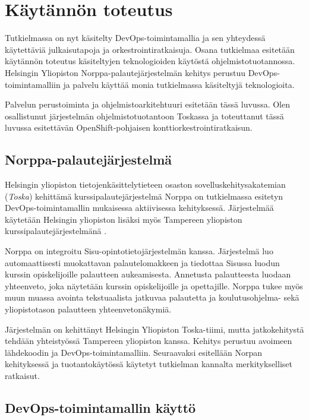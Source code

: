 \chapter{Käytännön toteutus\label{example}}

Tutkielmassa on nyt käsitelty DevOps-toimintamallia ja sen yhteydessä käytettäviä julkaisutapoja ja orkestrointiratkaisuja.
Osana tutkielmaa esitetään käytännön toteutus käsiteltyjen teknologioiden käytöstä ohjelmistotuotannossa.
Helsingin Yliopiston Norppa-palautejärjes\-telmän kehitys perustuu DevOps-toimintamalliin ja palvelu käyttää monia tutkielmassa käsiteltyjä teknologioita.

Palvelun perustoiminta ja ohjelmistoarkitehtuuri esitetään tässä luvussa.
Olen osallistunut järjestelmän ohjelmistotuotantoon Toskassa ja toteuttanut tässä luvussa esitettävän OpenShift-pohjaisen konttiorkestrointiratkaisun.

\section{Norppa-palautejärjestelmä}

Helsingin yliopiston tietojenkäsittelytieteen osaston sovelluskehitysakatemian (\textit{Toska}) \cite{Tenhunen23} kehittämä kurssipalautejärjestelmä Norppa on tutkielmassa esitetyn DevOps-toimintamal\-lin mukaisessa aktiivisessa kehityksessä.
Järjestelmää käytetään Helsingin yliopiston lisäksi myös Tampereen yliopiston kurssipalautejärjestelmänä \cite{Tampere23}.

Norppa on integroitu Sisu-opintotietojärjestelmän \cite{Laukka20} kanssa.
Järjestelmä luo automaattisesti muokattavan palautelomakkeen ja tiedottaa Sisussa luodun kurssin opiskelijoille palautteen aukeamisesta.
Annetusta palautteesta luodaan yhteenveto, joka näytetään kurssin opiskelijoille ja opettajille.
Norppa tukee myös muun muassa avointa tekstuaalista jatkuvaa palautetta ja koulutusohjelma- sekä yliopistotason palautteen yhteenvetonäkymiä.

Järjestelmän on kehittänyt Helsingin Yliopiston Toska-tiimi, mutta jatkokehitystä tehdään yhteistyössä Tampereen yliopiston kanssa.
Kehitys perustuu avoimeen lähdekoodin ja DevOps-toimintamalliin.
Seuraavaksi esitellään Norpan kehityksessä ja tuotantokäytössä käytetyt tutkielman kannalta merkitykselliset ratkaisut.

\section{DevOps-toimintamallin käyttö}

